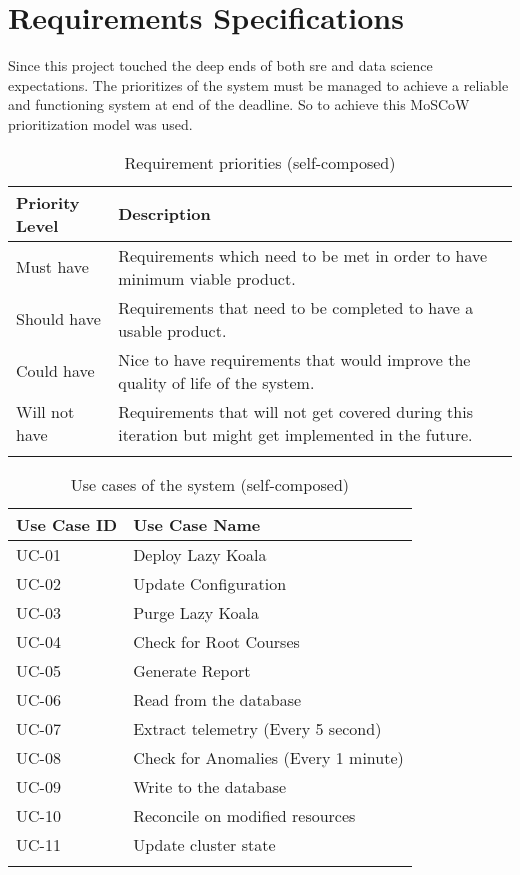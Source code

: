 \section{Requirements Specifications}

Since this project touched the deep ends of both \ac{sre} and data science expectations. The prioritizes of the system must be managed to achieve a reliable and functioning system at end of the deadline. So to achieve this MoSCoW prioritization model was used.

\begin{longtable}{|p{25mm}|p{128mm}|}
\hline
    \textbf{Priority Level} &
    \textbf{Description} \\ \hline
    
    Must have  &
    Requirements which need to be met in order to have minimum viable product. \\ \hline

    Should have &
    Requirements that need to be completed to have a usable product. \\ \hline

    Could have &
    Nice to have requirements that would improve the quality of life of the system. \\ \hline
    
    Will not have &
    Requirements that will not get covered during this iteration but might get implemented in the future.\\ \hline
\caption{Requirement priorities (self-composed)}
\end{longtable}

\begin{longtable}{|p{35mm}|p{118mm}|}
\hline
    \textbf{Use Case ID} & \textbf{Use Case Name }              \\ \hline
    UC-01                & Deploy Lazy Koala                    \\ \hline
    UC-02                & Update Configuration                 \\ \hline
    UC-03                & Purge Lazy Koala                     \\ \hline
    UC-04                & Check for Root Courses               \\ \hline
    UC-05                & Generate Report                      \\ \hline
    UC-06                & Read from the database               \\ \hline
    UC-07                & Extract telemetry (Every 5 second)   \\ \hline
    UC-08                & Check for Anomalies (Every 1 minute) \\ \hline
    UC-09                & Write to the database                \\ \hline
    UC-10                & Reconcile on modified resources      \\ \hline
    UC-11                & Update cluster state                 \\ \hline
\caption{Use cases of the system (self-composed)}
\end{longtable}


